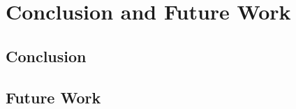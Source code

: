 \chapter{Conclusion and Future Work}
\label{chap:conclusion}

\section{Conclusion}
\label{sec:conclusion}

\section{Future Work}
\label{sec:future-work}
